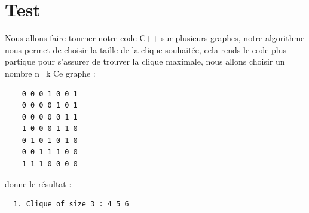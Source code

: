 \documentclass{article}
\begin{document}
\section{Test}
Nous allons faire tourner notre code C++ sur plusieurs graphes, notre algorithme
nous permet de choisir la taille de la clique souhaitée, cela rends le code plus partique
pour s'assurer de trouver la clique maximale, nous allons choisir un nombre n=k
Ce graphe :
\begin{center}
  \begin{verbatim}
    0 0 0 1 0 0 1
    0 0 0 0 1 0 1
    0 0 0 0 0 1 1
    1 0 0 0 1 1 0
    0 1 0 1 0 1 0
    0 0 1 1 1 0 0
    1 1 1 0 0 0 0
  \end{verbatim}
\end{center}
donne le résultat :
\begin{center}
  \begin{verbatim}
  1. Clique of size 3 : 4 5 6
  \end{verbatim}
\end{center}
\end{document}
